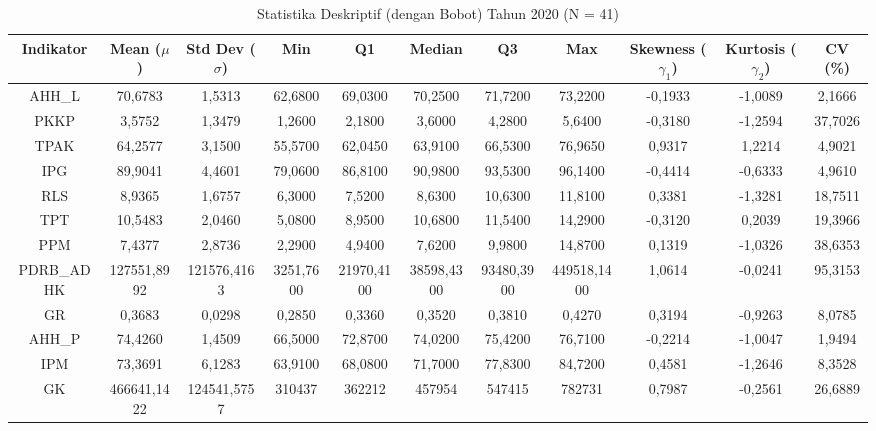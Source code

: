 \begin{table}[H]
\centering
\caption{Statistika Deskriptif (dengan Bobot) Tahun 2020 (N = 41)} \label{tab:app1desc_2020}
\begin{adjustbox}{max width=\textwidth, max height=0.85\textheight}
\begin{tabular}{|c|c|c|c|c|c|c|c|c|c|c|}
\hline
\textbf{Indikator} & \textbf{Mean ($\mu$)} & \textbf{Std Dev ($\sigma$)} & \textbf{Min} & \textbf{Q1} & \textbf{Median} & \textbf{Q3} & \textbf{Max} & \textbf{Skewness ($\gamma_1$)} & \textbf{Kurtosis ($\gamma_2$)} & \textbf{CV (\%)} \\
\hline
AHH\_L & 70,6783 & 1,5313 & 62,6800 & 69,0300 & 70,2500 & 71,7200 & 73,2200 & -0,1933 & -1,0089 & 2,1666 \\
PKKP & 3,5752 & 1,3479 & 1,2600 & 2,1800 & 3,6000 & 4,2800 & 5,6400 & -0,3180 & -1,2594 & 37,7026 \\
TPAK & 64,2577 & 3,1500 & 55,5700 & 62,0450 & 63,9100 & 66,5300 & 76,9650 & 0,9317 & 1,2214 & 4,9021 \\
IPG & 89,9041 & 4,4601 & 79,0600 & 86,8100 & 90,9800 & 93,5300 & 96,1400 & -0,4414 & -0,6333 & 4,9610 \\
RLS & 8,9365 & 1,6757 & 6,3000 & 7,5200 & 8,6300 & 10,6300 & 11,8100 & 0,3381 & -1,3281 & 18,7511 \\
TPT & 10,5483 & 2,0460 & 5,0800 & 8,9500 & 10,6800 & 11,5400 & 14,2900 & -0,3120 & 0,2039 & 19,3966 \\
PPM & 7,4377 & 2,8736 & 2,2900 & 4,9400 & 7,6200 & 9,9800 & 14,8700 & 0,1319 & -1,0326 & 38,6353 \\
PDRB\_ADHK & 127551,8992 & 121576,4163 & 3251,7600 & 21970,4100 & 38598,4300 & 93480,3900 & 449518,1400 & 1,0614 & -0,0241 & 95,3153 \\
GR & 0,3683 & 0,0298 & 0,2850 & 0,3360 & 0,3520 & 0,3810 & 0,4270 & 0,3194 & -0,9263 & 8,0785 \\
AHH\_P & 74,4260 & 1,4509 & 66,5000 & 72,8700 & 74,0200 & 75,4200 & 76,7100 & -0,2214 & -1,0047 & 1,9494 \\
IPM & 73,3691 & 6,1283 & 63,9100 & 68,0800 & 71,7000 & 77,8300 & 84,7200 & 0,4581 & -1,2646 & 8,3528 \\
GK & 466641,1422 & 124541,5757 & 310437 & 362212 & 457954 & 547415 & 782731 & 0,7987 & -0,2561 & 26,6889 \\
\hline
\end{tabular}
\end{adjustbox}
\end{table}